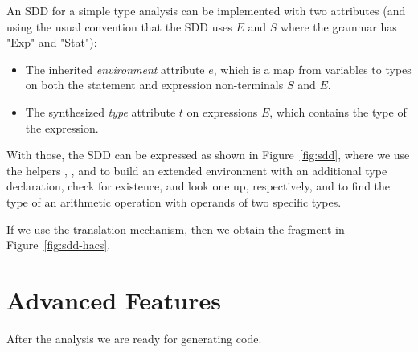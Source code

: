 \documentclass[11pt]{article} %
\begin{document}
\begin{example}\label{ex:sdd}
  An SDD for a simple type analysis can be implemented with two attributes (and using the usual
  convention that the SDD uses $E$ and $S$ where the \HAX grammar has "Exp" and "Stat"):
  \begin{itemize}

  \item The inherited \emph{environment} attribute $e$, which is a map from variables to types on
    both the statement and expression non-terminals $S$ and $E$.

  \item The synthesized \emph{type} attribute $t$ on expressions $E$, which contains the type of the
    expression.

  \end{itemize}
  With those, the SDD can be expressed as shown in Figure~\ref{fig:sdd}, where we use the helpers
  , , and  to build an extended environment with an additional
  type declaration, check for existence, and look one up, respectively, and  to find the
  type of an arithmetic operation with operands of two specific types.

  If we use the translation mechanism, then we obtain the \HAX fragment in
  Figure~\ref{fig:sdd-hacs}.
\end{example}


\section{Advanced Features}
\label{sec:advanced}

After the analysis we are ready for generating code.
\end{document}
